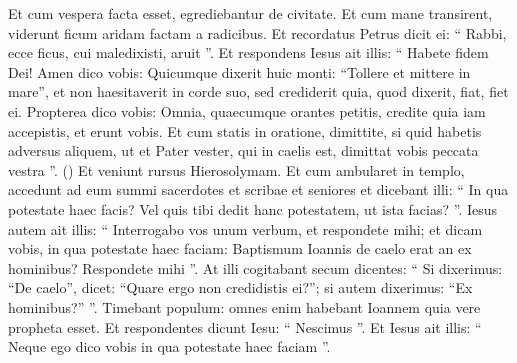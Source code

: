 \begin{biblechapter}
\begin{biblechapter}
\begin{biblechapter}
\begin{biblechapter}
\begin{biblechapter}
\begin{biblechapter}
\begin{biblechapter}
\begin{biblechapter}
\begin{biblechapter}
\begin{biblechapter}
\begin{biblechapter}
 \verse Et cum vespera facta esset, egrediebantur de civitate.
 \verse Et cum mane transirent, viderunt ficum aridam factam a radicibus. 
\verse Et recordatus Petrus dicit ei: “ Rabbi, ecce ficus, cui maledixisti, aruit ”. 
\verse Et respondens Iesus ait illis: “ Habete fidem Dei! 
\verse Amen dico vobis: Quicumque dixerit huic monti: “Tollere et mittere in mare”, et non haesitaverit in corde suo, sed crediderit quia, quod dixerit, fiat, fiet ei. 
 \verse Propterea dico vobis: Omnia, quaecumque orantes petitis, credite quia iam accepistis, et erunt vobis. 
\verse Et cum statis in oratione, dimittite, si quid habetis adversus aliquem, ut et
 Pater vester, qui in caelis est, dimittat vobis peccata vestra ”. 
(\verse) \verse Et veniunt rursus Hierosolymam. Et cum ambularet in templo, accedunt ad eum summi sacerdotes et scribae et seniores 
\verse et dicebant illi: “ In qua potestate haec facis? Vel quis tibi dedit hanc potestatem, ut ista facias? ”. 
\verse Iesus autem ait illis: “ Interrogabo vos unum verbum, et respondete mihi; et dicam vobis, in qua potestate haec faciam: 
\verse Baptismum Ioannis de caelo erat an ex hominibus? Respondete mihi ”. 
\verse At illi cogitabant secum dicentes: “ Si dixerimus: “De caelo”, dicet: “Quare ergo non credidistis ei?”; 
\verse si autem dixerimus: “Ex hominibus?” ”. Timebant populum: omnes enim habebant Ioannem quia vere propheta esset. 
\verse Et respondentes dicunt Iesu: “ Nescimus ”. Et Iesus ait illis: “ Neque ego dico vobis in qua potestate haec faciam ”.
 

\end{biblechapter}
\end{biblechapter}
\end{biblechapter}
\end{biblechapter}
\end{biblechapter}
\end{biblechapter}
\end{biblechapter}
\end{biblechapter}
\end{biblechapter}
\end{biblechapter}
\end{biblechapter}
